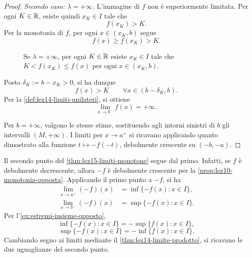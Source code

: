 \begin{proof}
\emph{Secondo caso: \(\lambda=+\infty\).}
L'immagine di \(f\) non è superiormente limitata.
Per ogni \(K\in\mathbb{R}\), esiste quindi \(x_K\in I\) tale che
\[
  f(x_K)>K.
\]
Per la monotonia di \(f\), per ogni \(x\in(x_K,b)\)
segue
\[
  f(x)\ge f(x_K)>K.
\]

\begin{figure}[H]
  \centering
  \caption{Se \(\lambda=+\infty\), per ogni \(K\in\mathbb{R}\)
  esiste \(x_K\in I\) tale che \(K<f(x_K)\le f(x)\)
  per ogni \(x\in(x_K,b)\).}
  \label{fig:lez15-supremo-infinito}
\end{figure}

Posto \(\delta_K:=b-x_K>0\), si ha dunque
\[
  f(x)>K
  \qquad\forall x\in(b-\delta_K,b).
\]
Per la \cref{def:lez14-limiti-unilateri}, si ottiene
\[
  \lim_{x\to b^-}f(x)=+\infty.
\]

Per \(b=+\infty\), valgono le stesse stime, sostituendo
agli intorni sinistri di \(b\) gli intervalli
\((M,+\infty)\). I limiti per \(x\to a^+\)
si ricavano applicando quanto dimostrato alla funzione
\(t\mapsto-f(-t)\), debolmente crescente su
\((-b,-a)\).
\end{proof}

Il secondo punto del \cref{thm:lez15-limiti-monotone}
segue dal primo. Infatti, se \(f\) è debolmente
decrescente, allora \(-f\) è debolmente crescente
per la \cref{prop:lez10-monotonia-opposta}. Applicando
il primo punto a \(-f\), si ha
\[
\begin{aligned}
  \lim_{x\to a^+}(-f)(x)
    &=\inf\{-f(x):x\in I\},\\
  \lim_{x\to b^-}(-f)(x)
    &=\sup\{-f(x):x\in I\}.
\end{aligned}
\]
Per l'\cref{ex:estremi-insieme-opposto},
\[
  \inf\{-f(x):x\in I\}=-\sup\{f(x):x\in I\},
\]
\[
  \sup\{-f(x):x\in I\}=-\inf\{f(x):x\in I\}.
\]
Cambiando segno ai limiti mediante il
\cref{thm:lez14-limite-prodotto}, si ricavano le
due uguaglianze del secondo punto.

